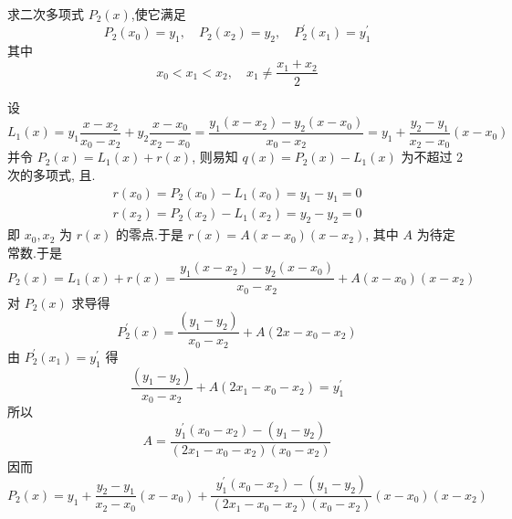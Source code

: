   \begin{tcolorbox}[enhanced,colback=10,colframe=9,breakable,coltitle=green!25!black,title=2024]
  
 求二次多项式 $ P_{2}(x) $,使它满足
$$
P_{2}\left(x_{0}\right)=y_{1}, \quad P_{2}\left(x_{2}\right)=y_{2}, \quad P_{2}^{\prime}\left(x_{1}\right)=y_{1}^{\prime}
$$
其中
$$
x_{0}<x_{1}<x_{2}, \quad x_{1} \neq \frac{x_{1}+x_{2}}{2}
$$

 \tcblower


设
$$ L_{1}(x)=y_{1} \frac{x-x_{2}}{x_{0}-x_{2}}+y_{2} \frac{x-x_{0}}{x_{2}-x_{0}}=\frac{y_{1}\left(x-x_{2}\right)-y_{2}\left(x-x_{0}\right)}{x_{0}-x_{2}}=y_{1}+\frac{y_{2}-y_{1}}{x_{2}-x_{0}}\left(x-x_{0}\right) $$
并令 $ P_{2}(x)=L_{1}(x)+r(x) $, 则易知 $ q(x)=P_{2}(x)-L_{1}(x) $ 为不超过 2 次的多项式, 且.
$$
\begin{array}{l}
r\left(x_{0}\right)=P_{2}\left(x_{0}\right)-L_{1}\left(x_{0}\right)=y_{1}-y_{1}=0 \\
r\left(x_{2}\right)=P_{2}\left(x_{2}\right)-L_{1}\left(x_{2}\right)=y_{2}-y_{2}=0
\end{array}
$$
即 $ x_{0}, x_{2} $ 为 $ r(x) $ 的零点.于是 $ r(x)=A\left(x-x_{0}\right)\left(x-x_{2}\right) $, 其中 $ A $ 为待定常数.于是
$$
P_{2}(x)=L_{1}(x)+r(x)=\frac{y_{1}\left(x-x_{2}\right)-y_{2}\left(x-x_{0}\right)}{x_{0}-x_{2}}+A\left(x-x_{0}\right)\left(x-x_{2}\right)
$$
对 $ P_{2}(x) $ 求导得
$$
P_{2}^{\prime}(x)=\frac{\left(y_{1}-y_{2}\right)}{x_{0}-x_{2}}+A\left(2 x-x_{0}-x_{2}\right)
$$
由 $ P_{2}^{\prime}\left(x_{1}\right)=y_{1}^{\prime} $ 得
$$
\frac{\left(y_{1}-y_{2}\right)}{x_{0}-x_{2}}+A\left(2 x_{1}-x_{0}-x_{2}\right)=y_{1}^{\prime}
$$
所以
$$
A=\frac{y_{1}^{\prime}\left(x_{0}-x_{2}\right)-\left(y_{1}-y_{2}\right)}{\left(2 x_{1}-x_{0}-x_{2}\right)\left(x_{0}-x_{2}\right)}
$$
因而 
$$ P_{2}(x)=y_{1}+\frac{y_{2}-y_{1}}{x_{2}-x_{0}}\left(x-x_{0}\right)+\frac{y_{1}^{\prime}\left(x_{0}-x_{2}\right)-\left(y_{1}-y_{2}\right)}{\left(2 x_{1}-x_{0}-x_{2}\right)\left(x_{0}-x_{2}\right)}\left(x-x_{0}\right)\left(x-x_{2}\right) $$

\end{tcolorbox}


